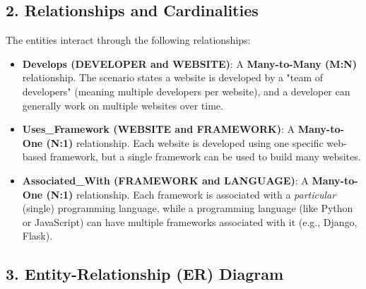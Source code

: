 \documentclass[12pt,a3paper]{article}
\begin{document}
\begin{enumerate}
\begin{tcolorbox}[enhanced,breakable,ansbox,colback=cA!4,colframe=cA,boxrule=0.8pt,arc=5pt,title={\textbf{Answer}},fonttitle=\bfseries\color{white},colbacktitle=cA]
\subsection*{2. Relationships and Cardinalities}
The entities interact through the following relationships:
\begin{itemize}
    \item \textbf{Develops (DEVELOPER and WEBSITE)}: A \textbf{Many-to-Many (M:N)} relationship. The scenario states a website is developed by a "team of developers" (meaning multiple developers per website), and a developer can generally work on multiple websites over time. 
    \item \textbf{Uses\_Framework (WEBSITE and FRAMEWORK)}: A \textbf{Many-to-One (N:1)} relationship. Each website is developed using one specific web-based framework, but a single framework can be used to build many websites.
    \item \textbf{Associated\_With (FRAMEWORK and LANGUAGE)}: A \textbf{Many-to-One (N:1)} relationship. Each framework is associated with a \textit{particular} (single) programming language, while a programming language (like Python or JavaScript) can have multiple frameworks associated with it (e.g., Django, Flask).
\end{itemize}

\vspace{1em}
\subsection*{3. Entity-Relationship (ER) Diagram}

\begin{center}
\end{center}
\end{tcolorbox}
\end{enumerate}
\end{document}

